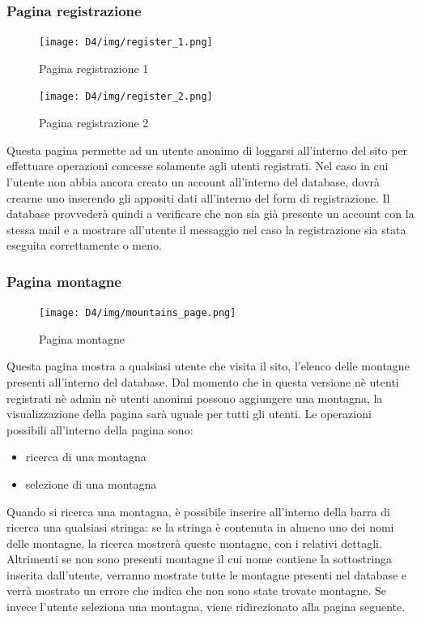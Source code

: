 \documentclass[a4paper,12pt]{article}
\begin{document}
\subsubsection{Pagina registrazione}
\begin{figure}[H]
    \centering
    \texttt{[image: D4/img/register\_1.png]}
    \caption{Pagina registrazione 1}
\end{figure}
\begin{figure}[H]
    \centering
    \texttt{[image: D4/img/register\_2.png]}
    \caption{Pagina registrazione 2}
\end{figure}
Questa pagina permette ad un utente anonimo di loggarsi all'interno del sito per effettuare operazioni concesse solamente agli utenti registrati. \newline
Nel caso in cui l'utente non abbia ancora creato un account all'interno del database, dovrà crearne uno inserendo gli appositi dati all'interno del form di registrazione. \newline
Il database provvederà quindi a verificare che non sia già presente un account con la stessa mail e a mostrare all'utente il messaggio nel caso la registrazione sia stata eseguita correttamente o meno.

\subsubsection{Pagina montagne}
\begin{figure}[H]
    \centering
    \texttt{[image: D4/img/mountains\_page.png]}
    \caption{Pagina montagne}
\end{figure}
Questa pagina mostra a qualsiasi utente che visita il sito, l'elenco delle montagne presenti all'interno del database. \newline
Dal momento che in questa versione nè utenti registrati nè admin nè utenti anonimi possono aggiungere una montagna, la visualizzazione della pagina sarà uguale per tutti gli utenti.
Le operazioni possibili all'interno della pagina sono:
\begin{itemize}
    \item ricerca di una montagna
    \item selezione di una montagna
\end{itemize}
Quando si ricerca una montagna, è possibile inserire all'interno della barra di ricerca una qualsiasi stringa: se la stringa è contenuta in almeno uno dei nomi delle montagne, la ricerca mostrerà queste montagne, con i relativi dettagli. \newline
Altrimenti se non sono presenti montagne il cui nome contiene la sottostringa inserita dall'utente, verranno mostrate tutte le montagne presenti nel database e verrà mostrato un errore che indica che non sono state trovate montagne. \newline
Se invece l'utente seleziona una montagna, viene ridirezionato alla pagina seguente.
\end{document}
